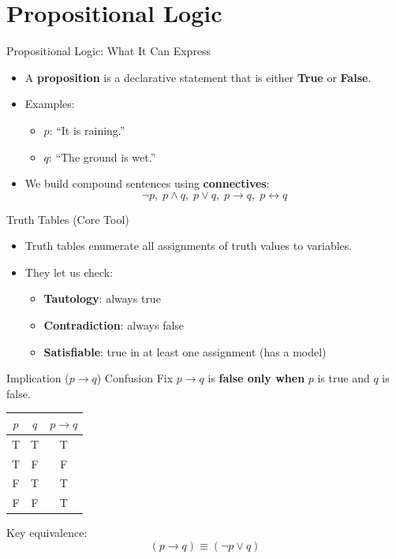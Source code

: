 \documentclass[aspectratio=169]{beamer}
\begin{document}
\section{Propositional Logic}
\label{sec:pl}

\begin{frame}{Propositional Logic: What It Can Express}
  \begin{itemize}[<+->]
    \item A \textbf{proposition} is a declarative statement that is either \textbf{True} or \textbf{False}.
    \item Examples:
    \begin{itemize}
      \item $p$: ``It is raining.''
      \item $q$: ``The ground is wet.''
    \end{itemize}
    \item We build compound sentences using \textbf{connectives}:
    \[
      \lnot p,\; p \land q,\; p \lor q,\; p \rightarrow q,\; p \leftrightarrow q
    \]
  \end{itemize}
\end{frame}

\begin{frame}{Truth Tables (Core Tool)}
  \begin{itemize}[<+->]
    \item Truth tables enumerate all assignments of truth values to variables.
    \item They let us check:
    \begin{itemize}
      \item \textbf{Tautology}: always true
      \item \textbf{Contradiction}: always false
      \item \textbf{Satisfiable}: true in at least one assignment (has a model)
    \end{itemize}
  \end{itemize}
\end{frame}

\begin{frame}{Implication ($p \rightarrow q$) Confusion Fix}
  $p \rightarrow q$ is \textbf{false only when} $p$ is true and $q$ is false.

  \vspace{0.6em}
  \centering
  \begin{tabular}{cc|c}
    \toprule
    $p$ & $q$ & $p \rightarrow q$ \\
    \midrule
    T & T & T \\
    T & F & F \\
    F & T & T \\
    F & F & T \\
    \bottomrule
  \end{tabular}

  \vspace{0.6em}
  Key equivalence:
  \[
    (p \rightarrow q) \equiv (\lnot p \lor q)
  \]
\end{frame}
\end{document}
